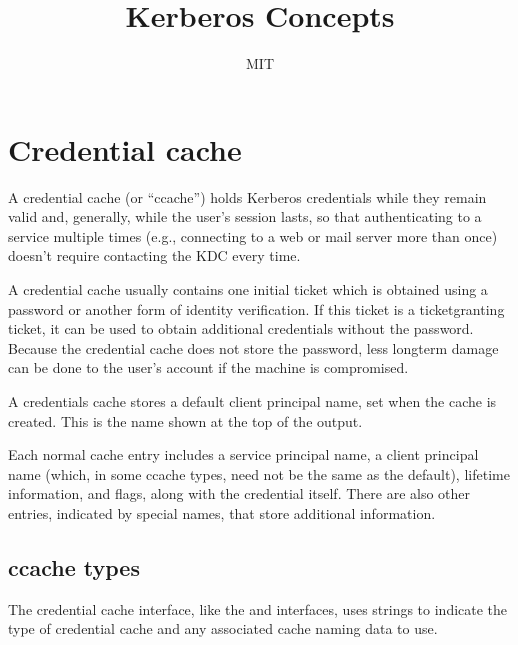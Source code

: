 \documentclass[letterpaper,10pt,english]{sphinxmanual}
\title{Kerberos Concepts}
\date{ }
\author{MIT}
\begin{document}
\pagestyle{empty}
\sphinxmaketitle
\pagestyle{plain}
\sphinxtableofcontents
\pagestyle{normal}
\label{\detokenize{basic/index::doc}}



\chapter{Credential cache}
\label{\detokenize{basic/ccache_def:credential-cache}}\label{\detokenize{basic/ccache_def:ccache-definition}}\label{\detokenize{basic/ccache_def::doc}}
\sphinxAtStartPar
A credential cache (or “ccache”) holds Kerberos credentials while they
remain valid and, generally, while the user’s session lasts, so that
authenticating to a service multiple times (e.g., connecting to a web
or mail server more than once) doesn’t require contacting the KDC
every time.

\sphinxAtStartPar
A credential cache usually contains one initial ticket which is
obtained using a password or another form of identity verification.
If this ticket is a ticket\sphinxhyphen{}granting ticket, it can be used to obtain
additional credentials without the password.  Because the credential
cache does not store the password, less long\sphinxhyphen{}term damage can be done
to the user’s account if the machine is compromised.

\sphinxAtStartPar
A credentials cache stores a default client principal name, set when
the cache is created.  This is the name shown at the top of the
  output.

\sphinxAtStartPar
Each normal cache entry includes a service principal name, a client
principal name (which, in some ccache types, need not be the same as
the default), lifetime information, and flags, along with the
credential itself.  There are also other entries, indicated by special
names, that store additional information.


\section{ccache types}
\label{\detokenize{basic/ccache_def:ccache-types}}
\sphinxAtStartPar
The credential cache interface, like the {\hyperref[\detokenize{basic/keytab_def:keytab-definition}]{}} and
{\hyperref[\detokenize{basic/rcache_def:rcache-definition}]{}} interfaces, uses  strings to
indicate the type of credential cache and any associated cache naming
data to use.
\end{document}
